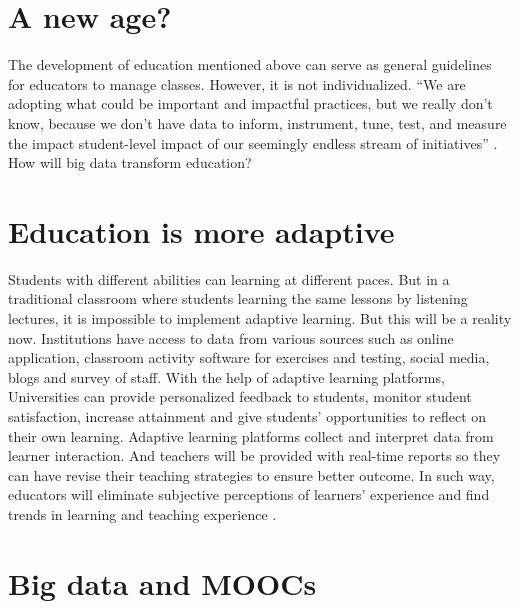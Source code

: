 \documentclass[sigconf]{acmart}
\begin{document}
\section{A new age?}

The development of education mentioned above can serve as general guidelines for educators to manage classes. However, it is not individualized. “We are adopting what could be important and impactful practices, but we really don’t know, because we don’t have data to inform, instrument, tune, test, and measure the impact student-level impact of our seemingly endless stream of initiatives” \cite{Milliron2016}. How will big data transform education?

\section{Education is more adaptive}

Students with different abilities can learning at different paces. But in a traditional classroom where students learning the same lessons by listening lectures, it is impossible to implement adaptive learning.  But this will be a reality now. Institutions have access to data from various sources such as online application, classroom activity software for exercises and testing, social media, blogs and survey of staff. With the help of adaptive learning platforms, Universities can provide personalized feedback to students, monitor student satisfaction, increase attainment and give students’ opportunities to reflect on their own learning.  Adaptive learning platforms collect and interpret data from learner interaction. And teachers will be provided with real-time reports so they can have revise their teaching strategies to ensure better outcome. In such way, educators will eliminate subjective perceptions of learners' experience and find trends in learning and teaching experience \cite{Learning2016}.

\section{Big data and MOOCs}
\end{document}
